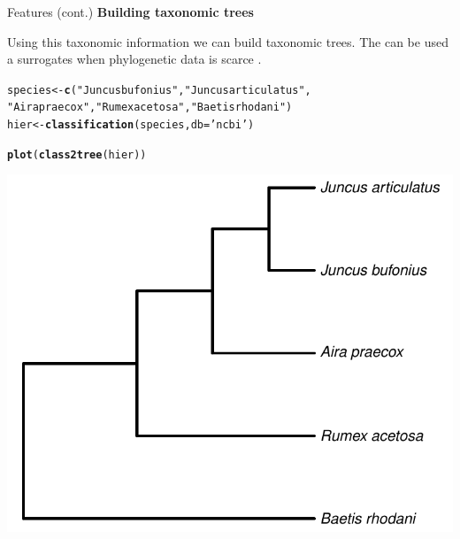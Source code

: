 \documentclass[final,t]{beamer}\usepackage[]{graphicx}\usepackage[]{color}
\makeatletter
\newcommand{\hlstr}[1]{\textcolor[rgb]{0.192,0.494,0.8}{#1}}%
\newcommand{\hlstd}[1]{\textcolor[rgb]{0.345,0.345,0.345}{#1}}%
\newcommand{\hlkwb}[1]{\textcolor[rgb]{0.69,0.353,0.396}{#1}}%
\newcommand{\hlkwc}[1]{\textcolor[rgb]{0.333,0.667,0.333}{#1}}%
\newcommand{\hlkwd}[1]{\textcolor[rgb]{0.737,0.353,0.396}{\textbf{#1}}}%
\newenvironment{kframe}{%
 \def\at@end@of@kframe{}%
 \ifinner\ifhmode%
  \def\at@end@of@kframe{\end{minipage}}%
  \begin{minipage}{\columnwidth}%
 \fi\fi%
 \def\FrameCommand##1{\hskip\@totalleftmargin \hskip-\fboxsep
 \colorbox{shadecolor}{##1}\hskip-\fboxsep
     \hskip-\linewidth \hskip-\@totalleftmargin \hskip\columnwidth}%
 \MakeFramed {\advance\hsize-\width
   \@totalleftmargin\z@ \linewidth\hsize
   \@setminipage}}%
 {\par\unskip\endMakeFramed%
 \at@end@of@kframe}
\newenvironment{knitrout}{}{} %
\renewenvironment{knitrout}{}{\vspace{-1.8em}}
\makeatother
\begin{document}
\begin{frame}[fragile]
\begin{columns}[t]
\begin{column}{.49\linewidth}
      \begin{block}{Features (cont.)}
\textcolor{i6bluedark}{\textbf{\large Building taxonomic trees}} 
        \vspace{0.5em}
        \par
        \begingroup
        \leftskip=2cm
        \noindent 
          Using this taxonomic information we can build taxonomic trees. 
          The can be used a surrogates when phylogenetic data is scarce \cite{guenard_using_2011}.
        \par
        \endgroup
\begin{knitrout}\footnotesize
{}\color{fgcolor}\begin{kframe}
\begin{alltt}
\hlstd{species} \hlkwb{<-} \hlkwd{c}\hlstd{(}\hlstr{"Juncus bufonius"}\hlstd{,} \hlstr{"Juncus articulatus"}\hlstd{,}
    \hlstr{"Aira praecox"}\hlstd{,} \hlstr{"Rumex acetosa"}\hlstd{,} \hlstr{"Baetis rhodani"}\hlstd{)}
\hlstd{hier} \hlkwb{<-} \hlkwd{classification}\hlstd{(species,} \hlkwc{db} \hlstd{=} \hlstr{'ncbi'}\hlstd{)}
\end{alltt}
\end{kframe}
\end{knitrout}

\begin{knitrout}\footnotesize
{}\color{fgcolor}\begin{kframe}
\begin{alltt}
\hlkwd{plot}\hlstd{(}\hlkwd{class2tree}\hlstd{(hier))}
\end{alltt}
\end{kframe}
\end{knitrout}
\vspace{2em}

\begin{knitrout}\footnotesize
{}\color{fgcolor}

{\centering \includegraphics[width=0.4\linewidth]{figure/classtree} 

}
\end{knitrout}
\end{block}
\end{column}
\end{columns}
\end{frame}
\end{document}

